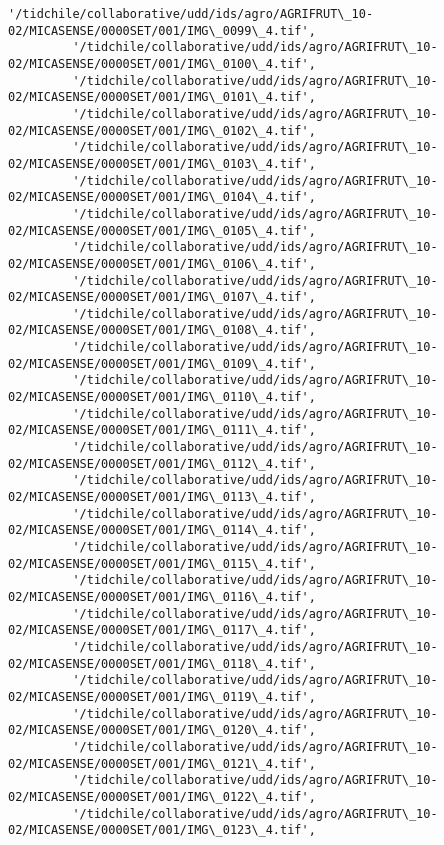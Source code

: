 \documentclass[11pt]{article}
\begin{document}
\begin{Verbatim}[commandchars=\\\{\}]
         '/tidchile/collaborative/udd/ids/agro/AGRIFRUT\_10-02/MICASENSE/0000SET/001/IMG\_0099\_4.tif',
         '/tidchile/collaborative/udd/ids/agro/AGRIFRUT\_10-02/MICASENSE/0000SET/001/IMG\_0100\_4.tif',
         '/tidchile/collaborative/udd/ids/agro/AGRIFRUT\_10-02/MICASENSE/0000SET/001/IMG\_0101\_4.tif',
         '/tidchile/collaborative/udd/ids/agro/AGRIFRUT\_10-02/MICASENSE/0000SET/001/IMG\_0102\_4.tif',
         '/tidchile/collaborative/udd/ids/agro/AGRIFRUT\_10-02/MICASENSE/0000SET/001/IMG\_0103\_4.tif',
         '/tidchile/collaborative/udd/ids/agro/AGRIFRUT\_10-02/MICASENSE/0000SET/001/IMG\_0104\_4.tif',
         '/tidchile/collaborative/udd/ids/agro/AGRIFRUT\_10-02/MICASENSE/0000SET/001/IMG\_0105\_4.tif',
         '/tidchile/collaborative/udd/ids/agro/AGRIFRUT\_10-02/MICASENSE/0000SET/001/IMG\_0106\_4.tif',
         '/tidchile/collaborative/udd/ids/agro/AGRIFRUT\_10-02/MICASENSE/0000SET/001/IMG\_0107\_4.tif',
         '/tidchile/collaborative/udd/ids/agro/AGRIFRUT\_10-02/MICASENSE/0000SET/001/IMG\_0108\_4.tif',
         '/tidchile/collaborative/udd/ids/agro/AGRIFRUT\_10-02/MICASENSE/0000SET/001/IMG\_0109\_4.tif',
         '/tidchile/collaborative/udd/ids/agro/AGRIFRUT\_10-02/MICASENSE/0000SET/001/IMG\_0110\_4.tif',
         '/tidchile/collaborative/udd/ids/agro/AGRIFRUT\_10-02/MICASENSE/0000SET/001/IMG\_0111\_4.tif',
         '/tidchile/collaborative/udd/ids/agro/AGRIFRUT\_10-02/MICASENSE/0000SET/001/IMG\_0112\_4.tif',
         '/tidchile/collaborative/udd/ids/agro/AGRIFRUT\_10-02/MICASENSE/0000SET/001/IMG\_0113\_4.tif',
         '/tidchile/collaborative/udd/ids/agro/AGRIFRUT\_10-02/MICASENSE/0000SET/001/IMG\_0114\_4.tif',
         '/tidchile/collaborative/udd/ids/agro/AGRIFRUT\_10-02/MICASENSE/0000SET/001/IMG\_0115\_4.tif',
         '/tidchile/collaborative/udd/ids/agro/AGRIFRUT\_10-02/MICASENSE/0000SET/001/IMG\_0116\_4.tif',
         '/tidchile/collaborative/udd/ids/agro/AGRIFRUT\_10-02/MICASENSE/0000SET/001/IMG\_0117\_4.tif',
         '/tidchile/collaborative/udd/ids/agro/AGRIFRUT\_10-02/MICASENSE/0000SET/001/IMG\_0118\_4.tif',
         '/tidchile/collaborative/udd/ids/agro/AGRIFRUT\_10-02/MICASENSE/0000SET/001/IMG\_0119\_4.tif',
         '/tidchile/collaborative/udd/ids/agro/AGRIFRUT\_10-02/MICASENSE/0000SET/001/IMG\_0120\_4.tif',
         '/tidchile/collaborative/udd/ids/agro/AGRIFRUT\_10-02/MICASENSE/0000SET/001/IMG\_0121\_4.tif',
         '/tidchile/collaborative/udd/ids/agro/AGRIFRUT\_10-02/MICASENSE/0000SET/001/IMG\_0122\_4.tif',
         '/tidchile/collaborative/udd/ids/agro/AGRIFRUT\_10-02/MICASENSE/0000SET/001/IMG\_0123\_4.tif',

\end{Verbatim}
\end{document}
